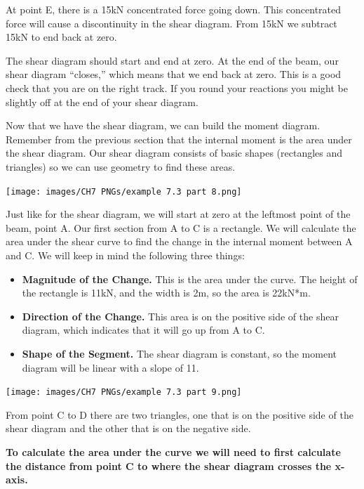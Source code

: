 \documentclass[
  letterpaper,
  DIV=11,
  numbers=noendperiod]{scrreprt}
\begin{document}
\begin{tcolorbox}
\begin{tcolorbox}
At point E, there is a 15kN concentrated force going down. This
concentrated force will cause a discontinuity in the shear diagram. From
15kN we subtract 15kN to end back at zero.

The shear diagram should start and end at zero. At the end of the beam,
our shear diagram ``closes,'' which means that we end back at zero. This
is a good check that you are on the right track. If you round your
reactions you might be slightly off at the end of your shear diagram.

Now that we have the shear diagram, we can build the moment diagram.
Remember from the previous section that the internal moment is the area
under the shear diagram. Our shear diagram consists of basic shapes
(rectangles and triangles) so we can use geometry to find these areas.

\begin{center}
\texttt{[image: images/CH7 PNGs/example 7.3 part 8.png]}
\end{center}

Just like for the shear diagram, we will start at zero at the leftmost
point of the beam, point A. Our first section from A to C is a
rectangle. We will calculate the area under the shear curve to find the
change in the internal moment between A and C. We will keep in mind the
following three things:

\begin{itemize}
\item
  \textbf{Magnitude of the Change.} This is the area under the curve.
  The height of the rectangle is 11kN, and the width is 2m, so the area
  is 22kN*m.
\item
  \textbf{Direction of the Change.} This area is on the positive side of
  the shear diagram, which indicates that it will go up from A to C.
\item
  \textbf{Shape of the Segment.} The shear diagram is constant, so the
  moment diagram will be linear with a slope of 11.
\end{itemize}

\begin{center}
\texttt{[image: images/CH7 PNGs/example 7.3 part 9.png]}
\end{center}

From point C to D there are two triangles, one that is on the positive
side of the shear diagram and the other that is on the negative side.

\textbf{To calculate the area under the curve we will need to first
calculate the distance from point C to where the shear diagram crosses
the x-axis.}


\end{tcolorbox}
\end{tcolorbox}
\end{document}
